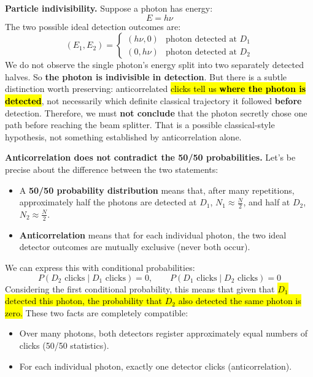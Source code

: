 \highspace
\textcolor{Green3}{ \textbf{Particle indivisibility.}} Suppose a photon has energy:
\begin{equation*}
    E = h\nu
\end{equation*}
The two possible ideal detection outcomes are:
\begin{equation*}
    \left(E_1, E_2\right) =
    \begin{cases}
        (h\nu, 0) & \text{photon detected at } D_1 \\
        (0, h\nu) & \text{photon detected at } D_2
    \end{cases}
\end{equation*}
We do not observe the single photon's energy split into two separately detected halves. So \textbf{the photon is indivisible in detection}. But there is a subtle distinction worth preserving: anticorrelated \hl{clicks tell us \textbf{where the photon is detected}}, not necessarily which definite classical trajectory it followed \textbf{before} detection. Therefore, we must \textbf{not conclude} that the photon secretly chose one path before reaching the beam splitter. That is a possible classical-style hypothesis, not something established by anticorrelation alone.

\newpage

\noindent
\textcolor{Green3}{ \textbf{Anticorrelation does not contradict the 50/50 probabilities.}} Let's be precise about the difference between the two statements:
\begin{itemize}
    \item A \textbf{50/50 probability distribution} means that, after many repetitions, approximately half the photons are detected at $D_1$, $N_1\approx \frac{N}{2}$, and half at $D_2$, $N_2\approx\frac{N}{2}$.
    \item \textbf{Anticorrelation} means that for each individual photon, the two ideal detector outcomes are mutually exclusive (never both occur).
\end{itemize}
We can express this with conditional probabilities:
\begin{equation*}
    P(D_2\text{ clicks}\mid D_1\text{ clicks})=0,
    \qquad
    P(D_1\text{ clicks}\mid D_2\text{ clicks})=0
\end{equation*}
Considering the first conditional probability, this means that given that \hl{$D_1$ detected this photon, the probability that $D_2$ also detected the same photon is zero.} These two facts are completely compatible:
\begin{itemize}
    \item Over many photons, both detectors register approximately equal numbers of clicks (50/50 statistics).
    \item For each individual photon, exactly one detector clicks (anticorrelation).
\end{itemize}

